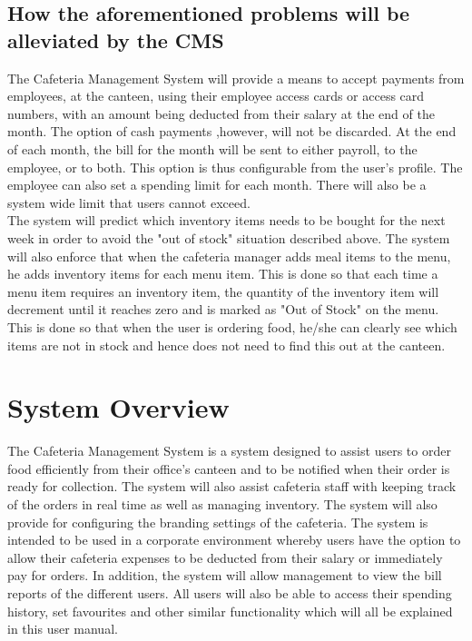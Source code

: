 \documentclass[a4paper,12pt]{report}
\begin{document}
\subsection{How the aforementioned problems will be alleviated by the CMS}
The Cafeteria Management System will provide a means to accept payments from employees, at the canteen, using their employee access cards or access card numbers, with an amount being deducted from their salary at the end of the month.  The option of cash payments ,however, will not be discarded. At the end of each month, the bill for the month will be sent to either payroll, to the employee, or to both. This option is thus configurable from the user's profile. The employee can also set a spending limit for each month. There will also be a system wide limit that users cannot exceed.
\\
The system will predict which inventory items needs to be bought for the next week in order to avoid the "out of stock" situation described above. The system will also enforce that when the cafeteria manager adds meal items to the menu, he adds inventory items for each menu item. This is done so that each time a menu item requires an inventory item, the quantity of the inventory item will decrement until it reaches zero and is marked as "Out of Stock" on the menu. This is done so that when the user is ordering food, he/she can clearly see which items are not in stock and hence does not need to find this out at the canteen.
\\
\section{System Overview}
The Cafeteria Management System is a system designed to assist users to order food efficiently from their office's canteen and to be notified when their order is ready for collection. The system will also assist cafeteria staff with keeping track of the orders in real time as well as managing inventory. The system will also provide for configuring the branding settings of the cafeteria. The system is intended to be used in a corporate environment whereby users have the option to allow their cafeteria expenses to be deducted from their salary or immediately pay for orders. In addition, the system will allow management to view the bill reports of the different users. All users will also be able to access their spending history, set favourites and other similar functionality which will all be explained in this user manual. \\
\end{document}
